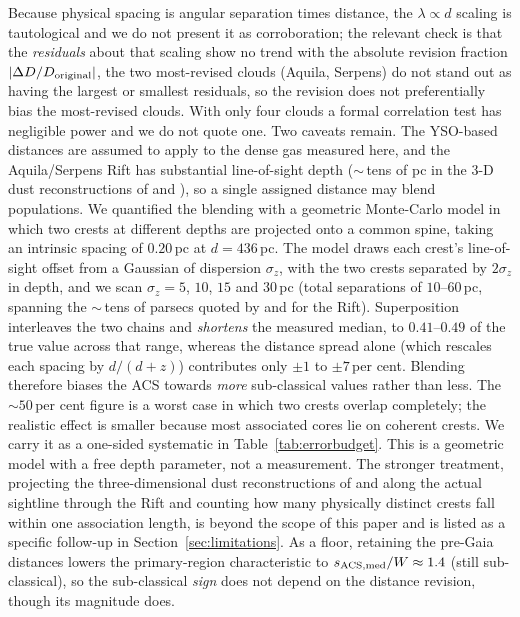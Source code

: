 \documentclass[usenatbib,twoside,twocolumn]{mnras}
\begin{document}
Because physical spacing is angular separation times distance, the $\lambda\propto d$ scaling is tautological and we do not present it as corroboration; the relevant check is that the \emph{residuals} about that scaling show no trend with the absolute revision fraction $|\Delta D/D_{\rm original}|$, the two most-revised clouds (Aquila, Serpens) do not stand out as having the largest or smallest residuals, so the revision does not preferentially bias the most-revised clouds. With only four clouds a formal correlation test has negligible power and we do not quote one. Two caveats remain. The YSO-based distances \citep{Zhang2023} are assumed to apply to the dense gas measured here, and the Aquila/Serpens Rift has substantial line-of-sight depth ($\sim$\,tens of pc in the 3-D dust reconstructions of \citealt{Zucker2020} and \citealt{Green2024}), so a single assigned distance may blend populations. We quantified the blending with a geometric Monte-Carlo model in which two crests at different depths are projected onto a common spine, taking an intrinsic spacing of $0.20$\,pc at $d=436$\,pc. The model draws each crest's line-of-sight offset from a Gaussian of dispersion $\sigma_z$, with the two crests separated by $2\sigma_z$ in depth, and we scan $\sigma_z=5$, $10$, $15$ and $30$\,pc (total separations of $10$--$60$\,pc, spanning the $\sim$\,tens of parsecs quoted by \citealt{Zucker2020} and \citealt{Green2024} for the Rift). Superposition interleaves the two chains and \emph{shortens} the measured median, to $0.41$--$0.49$ of the true value across that range, whereas the distance spread alone (which rescales each spacing by $d/(d+z)$) contributes only $\pm1$ to $\pm7$\,per cent. Blending therefore biases the ACS towards \emph{more} sub-classical values rather than less. The $\sim50$\,per cent figure is a worst case in which two crests overlap completely; the realistic effect is smaller because most associated cores lie on coherent crests. We carry it as a one-sided systematic in Table~\ref{tab:errorbudget}. This is a geometric model with a free depth parameter, not a measurement. The stronger treatment, projecting the three-dimensional dust reconstructions of \citet{Zucker2020} and \citet{Green2024} along the actual sightline through the Rift and counting how many physically distinct crests fall within one association length, is beyond the scope of this paper and is listed as a specific follow-up in Section~\ref{sec:limitations}. As a floor, retaining the pre-Gaia distances lowers the primary-region characteristic to $s_{\rm ACS,med}/W\approx1.4$ (still sub-classical), so the sub-classical \emph{sign} does not depend on the distance revision, though its magnitude does.
\end{document}
